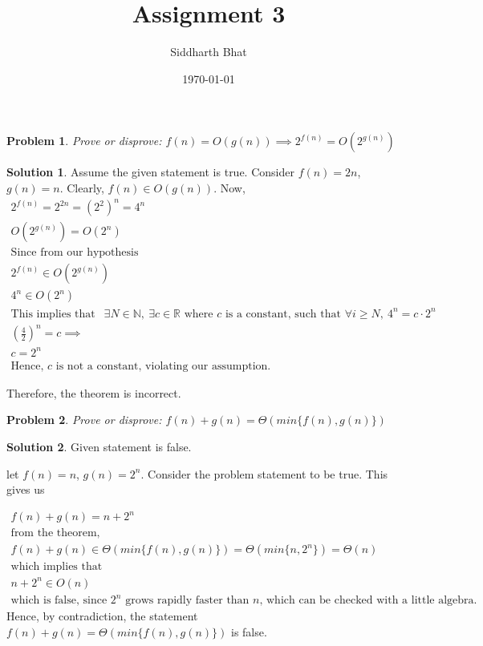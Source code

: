 \documentclass{article}
\newtheorem{problem}{Problem}
\theoremstyle{definition}
\newtheorem*{solution}{Solution}
\begin{document}
\title{Assignment 3}
\author{Siddharth Bhat}
\date{\today}
\maketitle

\begin{problem}
Prove or disprove: $f(n) = O(g(n)) \implies 2^{f(n)} = O(2^{g(n)})$
\end{problem}
\begin{solution}
	Assume the given statement is true. 
	Consider $f(n) = 2n$, $g(n) = n$. Clearly, $f(n) \in O(g(n))$.
	Now,
	\begin{gather*}
		2^{f(n)} = 2^{2n}= (2^2)^n = 4^n \\
		O(2^{g(n)}) = O(2^n) \\
		\text{Since from our hypothesis} \\
		2^{f(n)} \in O(2^{g(n)}) \\
		4^n \in O(2^n) \\
		\text{This implies that } \ \ \exists N \in \mathbb N,\ \exists c \in \mathbb R \text{ where $c$ is a constant, such that }
		\forall i \geq N, \ 4^n = c \cdot 2^n \\
		\left ( \frac{4}{2} \right ) ^n = c \implies \\
		c = 2^n \\
		\text{Hence, $c$ is not a constant, violating our assumption.}
	\end{gather*}
	
	Therefore, the theorem is incorrect.
\end{solution}

\begin{problem}
Prove or disprove: $f(n) + g(n) = \Theta(min \{ f(n), g(n) \})$
\end{problem}
\begin{solution}
	Given statement is false.
	
	let $f(n) = n$, $g(n) = 2^n$. Consider the problem statement to be
	true. This gives us
	
	\begin{gather*}
		f(n) + g(n) = n + 2^n \\
		\text{from the theorem, } \\
		f(n) + g(n) \in \Theta(min \{ f(n), g(n) \}) = \Theta(min \{n, 2^n \}) = \Theta(n) \\
		\text{which implies that} \\
		n + 2^n \in O(n) \\
		\text{which is false, since $2^n$ grows rapidly faster than $n$, which can
		be checked with a little algebra.}
	\end{gather*}
	Hence, by contradiction, the statement $f(n) + g(n) = \Theta(min \{ f(n), g(n) \})$ is false.
\end{solution}
\end{document}
